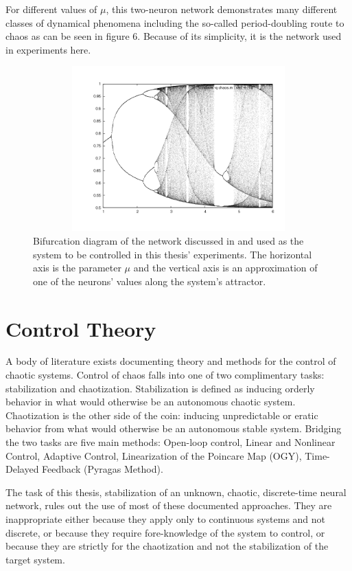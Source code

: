 \documentclass[12pt]{article}
\begin{document}
For different values of $\mu$,
this two-neuron network demonstrates many
different classes of dynamical phenomena including the so-called
period-doubling route to chaos as can be seen in figure 6.  Because of its
simplicity, it is the network used in experiments here.

\begin{figure}[htb]
\begin{center}
\includegraphics[height=2.5in,width=4.5in]{images/network_bifurc.png}
\caption{Bifurcation diagram of the network discussed in \cite{sole} and used as the system to be controlled in this thesis' experiments.  The horizontal axis is the parameter $\mu$ and the vertical axis is an approximation of one of the neurons' values along the system's attractor.}
\end{center}
\end{figure}

\clearpage

\section{Control Theory}
A body of literature exists documenting theory and methods for the control
of chaotic systems.  Control of chaos falls into one of two complimentary
tasks:  stabilization and chaotization\cite{control_review}.  Stabilization
is defined as inducing orderly behavior in what would otherwise be an
autonomous chaotic system.  Chaotization is the other side of the coin:
inducing unpredictable or eratic behavior from what would otherwise be an
autonomous stable system.
Bridging the two tasks are five main methods:  Open-loop control, Linear and
Nonlinear Control, Adaptive Control, Linearization of the Poincare Map (OGY),
Time-Delayed Feedback (Pyragas Method)\cite{control_review}.

The task of this thesis, stabilization of an unknown, chaotic, discrete-time 
neural network, rules
out the use of most of these documented approaches.  They are inappropriate
either because they apply only to continuous systems and not discrete, or
because they require fore-knowledge of the system to control, or because
they are strictly for the chaotization and not the stabilization of the
target system.
\end{document}
